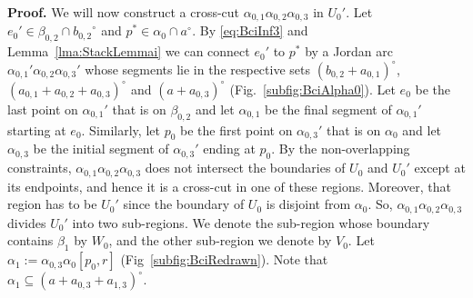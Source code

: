 \documentclass{article}
\newcommand{\ti}[2][]{{#2}^{\circ_{#1}}}
\newcommand{\qedsymbol}{\ding{113}}
\newenvironment{proof}{\par\noindent\textbf{Proof.}}{\mbox{}\hfill\qedsymbol\par\bigskip}
\begin{document}
\begin{proof}
We will now construct a cross-cut $\alpha_{0,1}\alpha_{0,2} \alpha_{0,3}$ in $U_0'$. 
Let $e_0'\in\beta_{0,2}\cap \ti{b_{0,2}}$ and $p^*\in\alpha_0\cap\ti a$. By \eqref{eq:BciInf3} 
and Lemma~\ref{lma:StackLemmai} we can connect $e_0'$ to $p^*$ by a Jordan arc 
$\alpha_{0,1}'\alpha_{0,2}\alpha_{0,3}'$ whose segments lie in the respective 
sets $\ti{(b_{0,2}+a_{0,1})}$, $\ti{(a_{0,1}+a_{0,2}+a_{0,3})}$ and $\ti{(a+a_{0,3})}$ 
(Fig.~\ref{subfig:BciAlpha0}).  Let $e_0$ be the last point on $\alpha_{0,1}'$ that is on 
$\beta_{0,2}$ and let $\alpha_{0,1}$ be the final segment of $\alpha_{0,1}'$ starting at $e_0$.
Similarly, let $p_0$ be the first point on $\alpha_{0,3}'$ that is on $\alpha_0$ and let $\alpha_{0,3}$
be the initial segment of $\alpha_{0,3}'$ ending at $p_0$. By the non-overlapping constraints, 
$\alpha_{0,1}\alpha_{0,2}\alpha_{0,3}$ does not intersect the boundaries of $U_0$ and $U_0'$
except at its endpoints, and hence it is a cross-cut in one of these regions. Moreover, that region has 
to be $U_0'$ since the boundary of $U_0$ is disjoint from $\alpha_0$. So, $\alpha_{0,1}\alpha_{0,2}
\alpha_{0,3}$ divides $U_0'$ into two sub-regions. We denote the sub-region whose boundary contains 
 $\beta_1$ by $W_0$, and the other sub-region we denote by $V_0$. Let 
 $\alpha_1:=\alpha_{0,3}\alpha_0[p_0,r]$ (Fig~\ref{subfig:BciRedrawn}). Note that 
 $\alpha_1\subseteq \ti{(a+a_{0,3}+a_{1,3})}$.
 

\end{proof}
\end{document}
